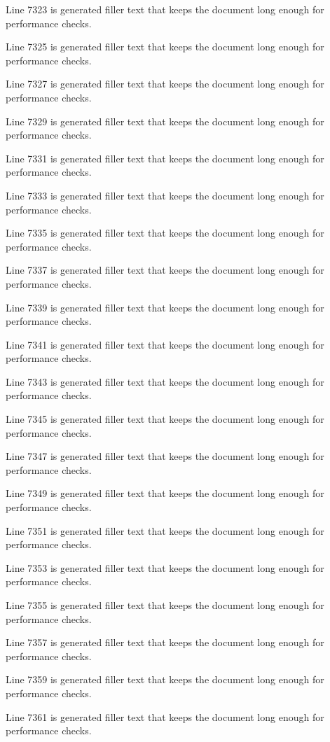 Line 7323 is generated filler text that keeps the document long enough for performance checks.

Line 7325 is generated filler text that keeps the document long enough for performance checks.

Line 7327 is generated filler text that keeps the document long enough for performance checks.

Line 7329 is generated filler text that keeps the document long enough for performance checks.

Line 7331 is generated filler text that keeps the document long enough for performance checks.

Line 7333 is generated filler text that keeps the document long enough for performance checks.

Line 7335 is generated filler text that keeps the document long enough for performance checks.

Line 7337 is generated filler text that keeps the document long enough for performance checks.

Line 7339 is generated filler text that keeps the document long enough for performance checks.

Line 7341 is generated filler text that keeps the document long enough for performance checks.

Line 7343 is generated filler text that keeps the document long enough for performance checks.

Line 7345 is generated filler text that keeps the document long enough for performance checks.

Line 7347 is generated filler text that keeps the document long enough for performance checks.

Line 7349 is generated filler text that keeps the document long enough for performance checks.

Line 7351 is generated filler text that keeps the document long enough for performance checks.

Line 7353 is generated filler text that keeps the document long enough for performance checks.

Line 7355 is generated filler text that keeps the document long enough for performance checks.

Line 7357 is generated filler text that keeps the document long enough for performance checks.

Line 7359 is generated filler text that keeps the document long enough for performance checks.

Line 7361 is generated filler text that keeps the document long enough for performance checks.

